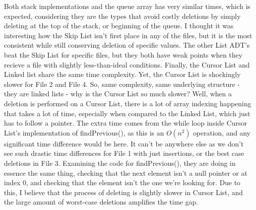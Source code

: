 \documentclass[12pt]{article}
\begin{document}
\begin{doublespace}
    Both stack implementations and the queue array has very similar times, which is expected, considering they are the types that avoid costly deletions by simply deleting at the top of the stack, or beginning of the queue. I thought it was interesting how the Skip List isn't first place in any of the files, but it is the most consistent while still conserving deletion of specific values. The other List ADT's beat the Skip List for specific files, but they both have weak points when they recieve a file with slightly less-than-ideal conditions. Finally, the Cursor List and Linked list share the same time complexity. Yet, the Cursor List is shockingly slower for File 2 and File 4. So, same complexity, same underlying structure - they are linked lists - why is the Cursor List so much slower? Well, when a deletion is performed on a Cursor List, there is a lot of array indexing happening that takes a lot of time, especially when compared to the Linked List, which just has to follow a pointer. The extra time comes from the while loop inside Cursor List's implementation of findPrevious(), as this is an $O(n^2)$ operation, and any significant time difference would be here. It can't be anywhere else as we don't see such drastic time differences for File 1 with just insertions, or the best case deletions in File 3. Examining the code for findPrevious(), they are doing in essence the same thing, checking that the next element isn't a null pointer or at index 0, and checking that the element isn't the one we're looking for. Due to this, I believe that the process of deleting is slightly slower in Cursor List, and the large amount of worst-case deletions amplifies the time gap.

\end{doublespace}
\end{document}
